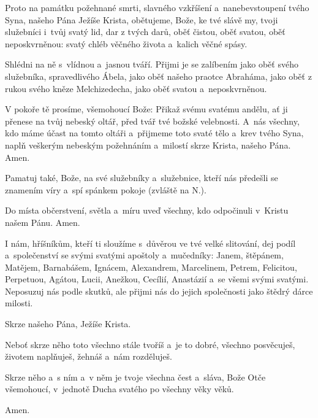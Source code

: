 Proto na památku požehnané smrti, slavného vzkříšení a~nanebevstoupení tvého Syna, našeho Pána Ježíše Krista, obětujeme, Bože, ke tvé slávě my, tvoji služebníci i~tvůj svatý lid, dar z tvých darů, oběť čistou, oběť svatou, oběť neposkvrněnou: svatý chléb věčného života a~kalich věčné spásy.

Shlédni na ně s~vlídnou a~jasnou tváří. Přijmi je se zalíbením jako oběť svého služebníka, spravedlivého Ábela, jako oběť našeho praotce Abraháma, jako oběť z rukou svého kněze Melchizedecha, jako oběť svatou a~neposkvrněnou.

V pokoře tě prosíme, všemohoucí Bože: Přikaž svému svatému andělu, ať ji přenese na tvůj nebeský oltář, před tvář tvé božské velebnosti. A~nás všechny, kdo máme účast na tomto oltáři a~přijmeme toto svaté tělo a~krev tvého Syna, naplň veškerým nebeským požehnáním a~milostí skrze Krista, našeho Pána. Amen.

Pamatuj také, Bože, na své služebníky a~služebnice, kteří nás předešli se znamením víry a~spí spánkem pokoje (zvláště na {\color{red}N.}).

Do místa občerstvení, světla a~míru uveď všechny, kdo odpočinuli v~Kristu našem Pánu. Amen.

I nám, hříšníkům, kteří ti sloužíme s~důvěrou ve tvé velké slitování, dej podíl a~společenství se svými svatými apoštoly a~mučedníky: Janem, štěpánem, Matějem, Barnabášem, Ignácem, Alexandrem, Marcelinem, Petrem, Felicitou, Perpetuou, Agátou, Lucii, Anežkou, Cecílií, Anastázií a~se všemi svými svatými. Neposuzuj nás podle skutků, ale přijmi nás do jejich společnosti jako štědrý dárce milosti.

Skrze našeho Pána, Ježíše Krista.

Neboť skrze něho toto všechno stále tvoříš a~je to dobré, všechno posvěcuješ, životem naplňuješ, žehnáš a~nám rozděluješ.

Skrze něho a~s ním a~v něm je tvoje všechna čest a~sláva, Bože Otče všemohoucí, v~jednotě Ducha svatého po všechny věky věků.

\Rbardot{} Amen.

